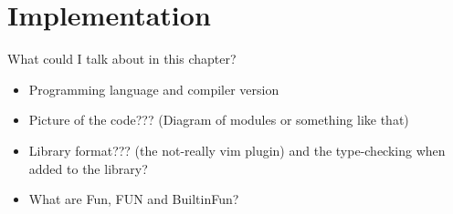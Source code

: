 \chapter{Implementation} \label{implementation}

What could I talk about in this chapter?
\begin{itemize}
\item Programming language and compiler version
\item Picture of the code??? (Diagram of modules or something like that)
\item Library format??? (the not-really vim plugin) and the type-checking when added to the library?
\item What are Fun, FUN and BuiltinFun?
\end{itemize}



